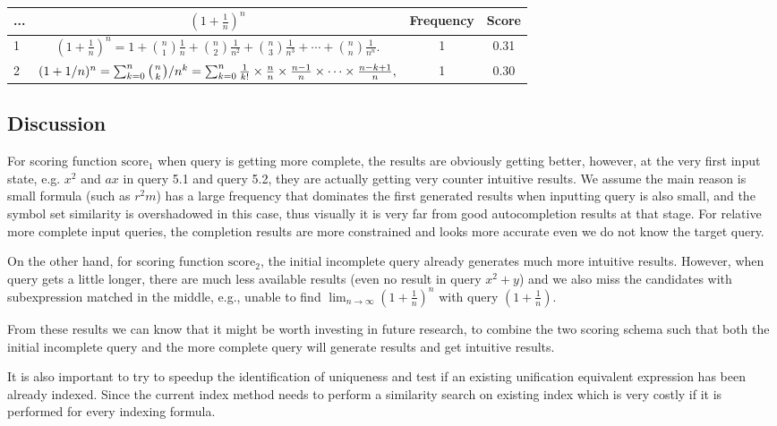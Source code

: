 \documentclass[12pt]{article} %
\begin{document}
\begin{center}
\begin{tabular}{lccc}
...  & $ (1+\frac 1 n)^n $ & Frequency & Score \\
\hline
 1 &  $ \left(1+\frac{1}{n}\right)^{n}=1+{n\choose 1}\frac{1}{n}+{n\choose 2}\frac{1}{n^{2}}+{n\choose 3}\frac{1}{n^{3}}+\cdots+{n\choose n}\frac{1}{n^{n}}.  $ & 1 & 0.31 \\
 2 &  $ (1+1/n)^{n}=\sum_{k=0}^{n}{\left({{n}\atop{k}}\right)}/n^{k}=\sum_{k=0}^{n}\frac{1}{k!}\times\frac{n}{n}\times\frac{n-1}{n}\times\cdots\times\frac{n-k+1}{n},  $ & 1 & 0.30 \\
\end{tabular}
\end{center}

\subsection{Discussion}
For scoring function $\text{score}_1$ when query is getting more complete, the results are obviously
getting better, however, at the very first input state, e.g. $x^2$ and $ax$ in query 5.1 and query 5.2, they are actually getting very counter intuitive results.
We assume the main reason is small formula (such as $r^2m$) has a large frequency that dominates the
first generated results when inputting query is also small, and the symbol set similarity is overshadowed in this case, thus visually it is very far from good autocompletion results at that stage.
For relative more complete input queries, the completion results are more constrained and looks more accurate even we do not know the target query.

On the other hand, for scoring function $\text{score}_2$, the initial incomplete query already generates much more intuitive results. However, when query gets a little longer, there are much less available results (even no result in query $x^2 + y$) and we also miss the candidates with subexpression matched in the middle, e.g., unable to find $\lim_{n\to\infty}\left(1+\frac{1}{n}\right)^{n}$ with query $(1+\frac 1 n)$.

From these results we can know that it might be worth investing in future research, to
combine the two scoring schema such that both the initial incomplete query and the more complete query will generate results and get intuitive results.

It is also important to try to speedup the identification of uniqueness and test if an existing unification equivalent expression has been already indexed. Since the current index method needs to perform a similarity search on existing index which is very costly if it is performed for every indexing formula.
\end{document}
